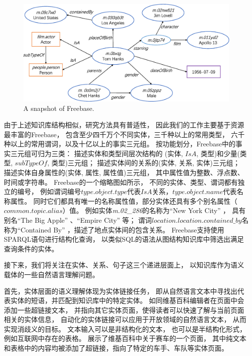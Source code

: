 \begin{figure}[th]
\centering
\includegraphics[width=0.8\columnwidth]{figure/intro/0_freebase_crop_xs.eps}
{A snapshot of Freebase.}
\label{fig:intro-freebase}
\end{figure}

由于上述知识库结构相似，研究方法具有普适性，
因此我们的工作主要基于资源最丰富的Freebase，
包含至少四千万个不同实体，三千种以上的常用类型，
六千种以上的常用谓词，以及十亿以上的事实三元组。
按功能划分，Freebase中的事实三元组可归为三类：
描述实体和类型间层次结构的
(实体, $IsA$, 类型)和少量(类型, $subTypeOf$, 类型)三元组；
描述实体间的关系的(实体, 关系, 实体)三元组；
描述实体自身属性的(实体, 属性, 属性值)三元组，
其中属性值为整数、浮点数、时间或字符串。
Freebase的一个缩略图如所示，
不同的实体、类型、谓词都有独立的编号，
例如谓词编号$type.object.type$代表$IsA$关系，$type.object.name$代表名称属性。
同时它们都具有唯一的名称属性值，部分实体还具有多个别名属性（$common.topic.alias$）值。
例如实体\textit{m.02\_286}的名称为``New York City'' ，
具有别名``The Big Apple'' 、``Empire City'' 等；
谓词$location.location.contained\_by$名称为``Contained By'' ，描述了地点实体间的包含关系。
Freebase支持使用SPARQL语句进行结构化查询，
以类似SQL的语法从图结构知识库中筛选出满足查询条件的实体。




接下来，我们将关注在实体、关系、句子这三个递进层面上，
以知识库作为语义载体的一些自然语言理解问题。

首先，实体层面的语义理解体现为实体链接任务，
即从自然语言文本中寻找出代表实体的短语，并匹配到知识库中的特定实体。
如同维基百科编辑者在页面中会添加一些超链接文本，
并指向其它实体页面，使得读者可以快速了解与当前页面相关的实体信息，
自动化的实体链接可以应用于开放领域的自然语言文本，
从而实现消歧义的目标。
文本输入可以是非结构化的文本，
也可以是半结构化形式，例如互联网中存在的表格。
展示了维基百科中关于赛车的一个页面，
其中纯文本和表格中的内容均被添加了超链接，指向了特定的车手、车队等实体页面。


